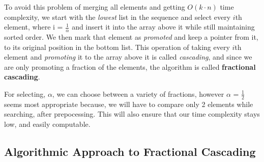 \documentclass[11pt]{article}
\begin{document}
To avoid this problem of merging all elements and getting $O(k \cdot n)$ time complexity, we start with the \textit{lowest} list in the sequence and select every $i$th element, where i = $\frac{1}{\alpha}$ and insert it into the array above it while still maintaining sorted order. We then mark that element as \textit{promoted} and keep a pointer from it, to its original position in the bottom list. This operation of taking every $i$th element and \textit{promoting} it to the array above it is called \textit{cascading}, and since we are only promoting a fraction of the elements, the algorithm is called \textbf{fractional cascading}.

For selecting, $\alpha$, we can choose between a variety of fractions, however $\alpha$ = $\frac{1}{2}$ seems most appropriate because, we will have to compare only 2 elements while searching, after prepocessing. This will also ensure that our time complexity stays low, and easily computable.


\subsection{Algorithmic Approach to Fractional Cascading}
\end{document}
